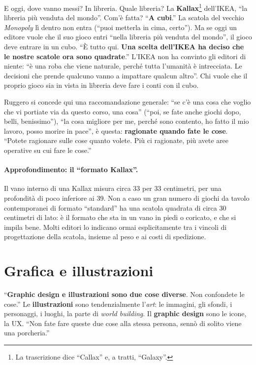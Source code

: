 E oggi, dove vanno messi? In libreria. Quale libreria? La \textbf{Kallax}\footnote{La
trascrizione dice ``Callax'' e, a tratti, ``Galaxy''.} dell'IKEA, ``la libreria più
venduta del mondo''. Com'è fatta? ``\textbf{A cubi}.'' La scatola del vecchio
\emph{Monopoly} lì dentro non entra (``puoi metterla in cima, certo''). Ma se oggi un
editore vuole che il suo gioco entri ``nella libreria più venduta del mondo'', il gioco
deve entrare in un cubo. ``È tutto qui. \textbf{Una scelta dell'IKEA ha deciso che le
nostre scatole ora sono quadrate}.'' L'IKEA non ha convinto gli editori di niente: ``è
una roba che viene naturale, perché tutta l'umanità è intrecciata. Le decisioni che
prende qualcuno vanno a impattare qualcun altro''. Chi vuole che il proprio gioco sia in
vista in libreria deve fare i conti con il cubo.

Ruggero si concede qui una raccomandazione generale: ``se c'è una cosa che voglio che vi
portiate via da questo corso, una cosa'' (``poi, se fate anche giochi dopo, belli,
benissimo''), ``la cosa migliore per me, perché sono contento, ho fatto il mio lavoro,
posso morire in pace'', è questa: \textbf{ragionate quando fate le cose}. ``Potete
ragionare sulle cose quanto volete. Più ci ragionate, più avete aree operative su cui
fare le cose.''

\paragraph{Approfondimento: il ``formato Kallax''.} Il vano interno di una Kallax misura
circa 33 per 33 centimetri, per una profondità di poco inferiore ai 39. Non a caso un
gran numero di giochi da tavolo contemporanei di formato ``standard'' ha una scatola
quadrata di circa 30 centimetri di lato: è il formato che sta in un vano in piedi o
coricato, e che si impila bene. Molti editori lo indicano ormai esplicitamente tra i
vincoli di progettazione della scatola, insieme al peso e ai costi di spedizione.

\section{Grafica e illustrazioni}
\label{a10:sec:grafica}



``\textbf{Graphic design e illustrazioni sono due cose diverse}. Non confondete le
cose.'' Le \textbf{illustrazioni} sono tendenzialmente l'\emph{art}: le immagini,
gli sfondi, i personaggi, i luoghi, la parte di \emph{world building}. Il
\textbf{graphic design} sono le icone, la UX. ``Non fate fare queste due cose alla
stessa persona, sennò di solito viene una porcheria.''

